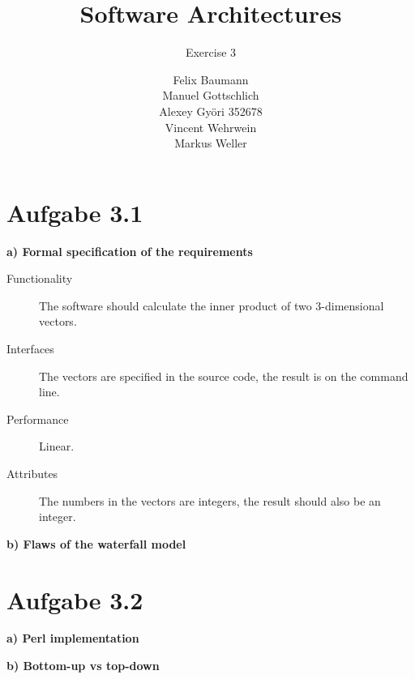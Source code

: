 \documentclass[a4paper,10pt]{scrartcl}[2003/01/01]
\title{Software Architectures}
\subtitle{Exercise 3}
\author{ Felix Baumann \\ Manuel Gottschlich \\  Alexey Gy\"ori 352678 \\ Vincent Wehrwein \\ Markus Weller}
\begin{document}
    \maketitle
    
    \section*{Aufgabe 3.1}
    \textbf{a) Formal specification of the requirements}
    \begin{description}
      \item[Functionality] The software should calculate the inner product of two 3-dimensional vectors.
      \item[Interfaces] The vectors are specified in the source code, the result is on the command line.
      \item[Performance] Linear.
      \item[Attributes] The numbers in the vectors are integers, the result should also be an integer. 
    \end{description}
    
    \textbf{b) Flaws of the waterfall model}
    
    \break
    \section*{Aufgabe 3.2}
    \textbf{a) Perl implementation}
    
    \textbf{b) Bottom-up vs top-down}
\end{document}
